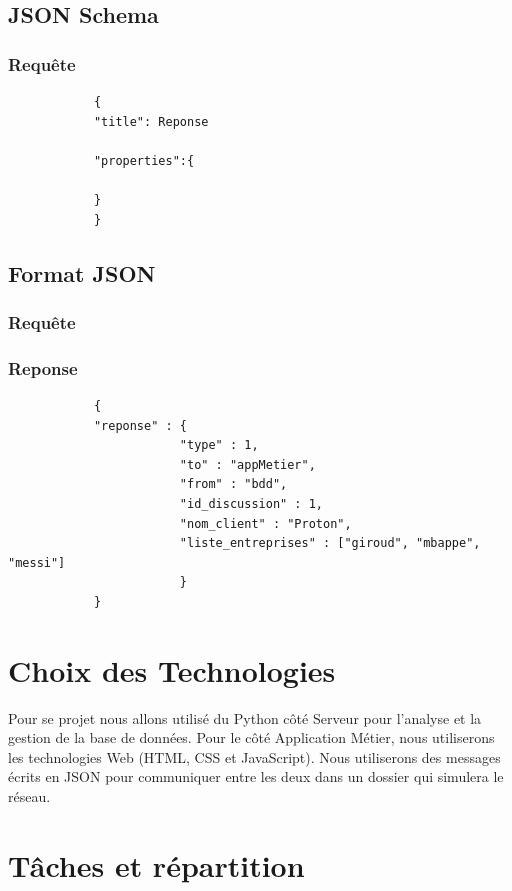 \documentclass[a4paper, 11pt]{article}
\begin{document}
    \subsection{JSON Schema}
        \subsubsection{Requête}
        \begin{verbatim}
            {
            "title": Reponse
            
            "properties":{
                
            }
            }
        \end{verbatim}
    
    
    \subsection{Format JSON}
        \subsubsection{Requête}
            
        \subsubsection{Reponse}
        \begin{verbatim}
            {
            "reponse" : {
                        "type" : 1,
                        "to" : "appMetier",
                        "from" : "bdd",
                        "id_discussion" : 1,
                        "nom_client" : "Proton",
                        "liste_entreprises" : ["giroud", "mbappe", "messi"]
                        }
            }
        \end{verbatim}
\section{Choix des Technologies}
Pour se projet nous allons utilisé du Python côté Serveur pour l'analyse et la gestion de la base de données. Pour le côté Application Métier, nous utiliserons les technologies Web (HTML, CSS et JavaScript). Nous utiliserons des messages écrits en JSON pour communiquer entre les deux dans un dossier qui simulera le réseau.

\section{Tâches et répartition}
\end{document}
